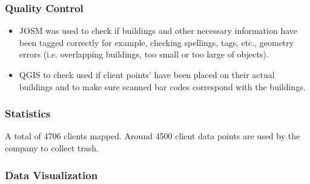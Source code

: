 \documentclass[a4paper,12pt,twoside]{article}
\begin{document}
\subsubsection{Quality Control}
\begin{itemize}
    \item JOSM was used to check if buildings and other necessary information have been tagged correctly for example, checking spellings, tags, etc., geometry errors (i.e. overlapping buildings, too small or too large of objects). 
     \item QGIS to check used if client points' have been placed on their actual buildings and to make sure scanned bar codes correspond with the buildings.
\end{itemize}

\subsubsection{Statistics}
A total of 4706 clients mapped.
Around 4500 client data points are used by the company to collect trash.


\subsubsection{Data Visualization}
\end{document}
